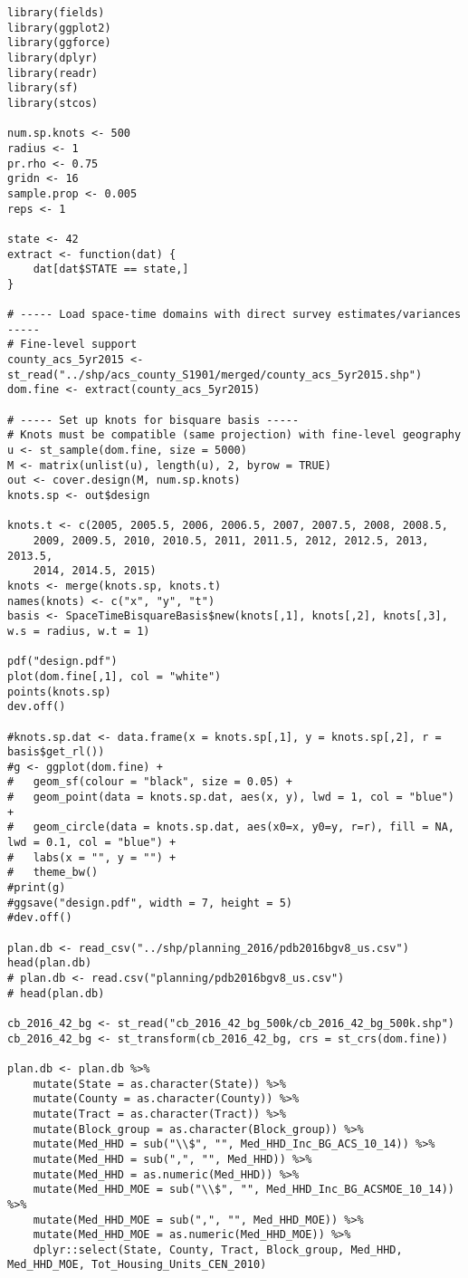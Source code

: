 \documentclass[12pt]{article}
\begin{document}
\begin{scriptsize}
\begin{verbatim}
library(fields)
library(ggplot2)
library(ggforce)
library(dplyr)
library(readr)
library(sf)
library(stcos)

num.sp.knots <- 500
radius <- 1
pr.rho <- 0.75
gridn <- 16
sample.prop <- 0.005
reps <- 1

state <- 42
extract <- function(dat) {
	dat[dat$STATE == state,]
}

# ----- Load space-time domains with direct survey estimates/variances -----
# Fine-level support
county_acs_5yr2015 <- st_read("../shp/acs_county_S1901/merged/county_acs_5yr2015.shp")
dom.fine <- extract(county_acs_5yr2015)

# ----- Set up knots for bisquare basis -----
# Knots must be compatible (same projection) with fine-level geography
u <- st_sample(dom.fine, size = 5000)
M <- matrix(unlist(u), length(u), 2, byrow = TRUE)
out <- cover.design(M, num.sp.knots)
knots.sp <- out$design

knots.t <- c(2005, 2005.5, 2006, 2006.5, 2007, 2007.5, 2008, 2008.5,
	2009, 2009.5, 2010, 2010.5, 2011, 2011.5, 2012, 2012.5, 2013, 2013.5,
	2014, 2014.5, 2015)
knots <- merge(knots.sp, knots.t)
names(knots) <- c("x", "y", "t")
basis <- SpaceTimeBisquareBasis$new(knots[,1], knots[,2], knots[,3], w.s = radius, w.t = 1)

pdf("design.pdf")
plot(dom.fine[,1], col = "white")
points(knots.sp)
dev.off()

#knots.sp.dat <- data.frame(x = knots.sp[,1], y = knots.sp[,2], r = basis$get_rl())
#g <- ggplot(dom.fine) +
#	geom_sf(colour = "black", size = 0.05) +
#	geom_point(data = knots.sp.dat, aes(x, y), lwd = 1, col = "blue") +
#	geom_circle(data = knots.sp.dat, aes(x0=x, y0=y, r=r), fill = NA, lwd = 0.1, col = "blue") +
#	labs(x = "", y = "") +
#	theme_bw()
#print(g)
#ggsave("design.pdf", width = 7, height = 5)
#dev.off()

plan.db <- read_csv("../shp/planning_2016/pdb2016bgv8_us.csv")
head(plan.db)
# plan.db <- read.csv("planning/pdb2016bgv8_us.csv")
# head(plan.db)

cb_2016_42_bg <- st_read("cb_2016_42_bg_500k/cb_2016_42_bg_500k.shp")
cb_2016_42_bg <- st_transform(cb_2016_42_bg, crs = st_crs(dom.fine))

plan.db <- plan.db %>%
	mutate(State = as.character(State)) %>%
	mutate(County = as.character(County)) %>%
	mutate(Tract = as.character(Tract)) %>%
	mutate(Block_group = as.character(Block_group)) %>%
	mutate(Med_HHD = sub("\\$", "", Med_HHD_Inc_BG_ACS_10_14)) %>%
	mutate(Med_HHD = sub(",", "", Med_HHD)) %>%
	mutate(Med_HHD = as.numeric(Med_HHD)) %>%
	mutate(Med_HHD_MOE = sub("\\$", "", Med_HHD_Inc_BG_ACSMOE_10_14)) %>%
	mutate(Med_HHD_MOE = sub(",", "", Med_HHD_MOE)) %>%
	mutate(Med_HHD_MOE = as.numeric(Med_HHD_MOE)) %>%
	dplyr::select(State, County, Tract, Block_group, Med_HHD, Med_HHD_MOE, Tot_Housing_Units_CEN_2010)


\end{verbatim}
\end{scriptsize}
\end{document}
